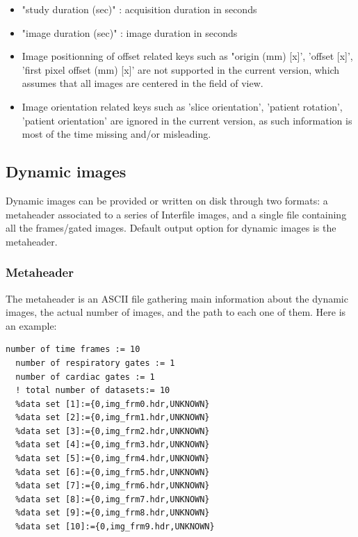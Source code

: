\documentclass[a4paper, 11pt]{article}
\begin{document}
\begin{itemize}
  \item "study duration (sec)" : acquisition duration in seconds 
  \item "image duration (sec)" : image duration in seconds
  \item Image positionning of offset related keys such as "origin (mm) [x]', 'offset [x]', 'first pixel offset (mm) [x]' are not supported in
        the current version, which assumes that all images are centered in the field of view.
  \item Image orientation related keys such as 'slice orientation', 'patient rotation', 'patient orientation' are ignored in the current version,
        as such information is most of the time missing and/or misleading.
\end{itemize}

\subsection{Dynamic images}
\label{ss_intf_dynamic}

Dynamic images can be provided or written on disk through two formats: a metaheader associated to a series of Interfile images, and a single file
containing all the frames/gated images. Default output option for dynamic images is the metaheader.

\subsubsection{Metaheader}
\label{sss_intf_dynamic_mhd}

The metaheader is an ASCII file gathering main information about the dynamic images, the actual number of images, and the path to each one of them.
Here is an example:

\begin{lstlisting}[label={intfMHD},caption= Interfile Metaheader mandatory keys for reading]
  number of time frames := 10
  number of respiratory gates := 1
  number of cardiac gates := 1
  ! total number of datasets:= 10
  %data set [1]:={0,img_frm0.hdr,UNKNOWN}
  %data set [2]:={0,img_frm1.hdr,UNKNOWN}
  %data set [3]:={0,img_frm2.hdr,UNKNOWN}
  %data set [4]:={0,img_frm3.hdr,UNKNOWN}
  %data set [5]:={0,img_frm4.hdr,UNKNOWN}
  %data set [6]:={0,img_frm5.hdr,UNKNOWN}
  %data set [7]:={0,img_frm6.hdr,UNKNOWN}
  %data set [8]:={0,img_frm7.hdr,UNKNOWN}
  %data set [9]:={0,img_frm8.hdr,UNKNOWN}
  %data set [10]:={0,img_frm9.hdr,UNKNOWN}
\end{lstlisting}
\end{document}
